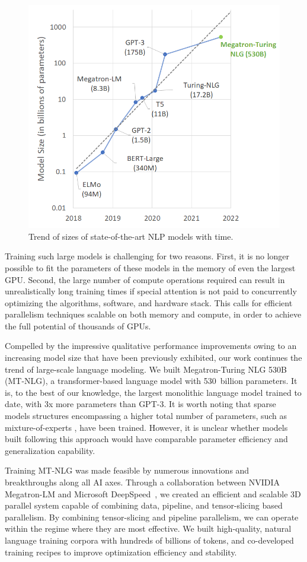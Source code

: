 \documentclass[11pt]{article}
\newcommand{\ours}{MT-NLG}
\begin{document}
\begin{figure}
    \centering
    \includegraphics[width=0.65\linewidth]{nlp-size-over-time.png}
    \caption{Trend of sizes of state-of-the-art NLP models with time.}
    \label{fig:nlp_trends}
\end{figure}

Training such large models is challenging for two reasons.  First, it is no longer possible to fit the parameters of these models in the memory of even the largest GPU.
Second, the large number of compute operations required can result in unrealistically long training times if special attention is not paid to concurrently optimizing the algorithms, software, and hardware stack. This calls for efficient parallelism techniques scalable on both memory and compute, in order to achieve the full potential of thousands of GPUs.


Compelled by the impressive qualitative performance improvements owing to an increasing model size that have been previously exhibited, our work continues the trend of large-scale language modeling. We built Megatron-Turing NLG 530B ({\ours}), a transformer-based language model with 530~billion  parameters. It is, to the best of our knowledge, the largest monolithic language model trained to date, with 3x more parameters than GPT-3. It is worth noting that sparse models structures encompassing a higher total number of parameters, such as mixture-of-experts \cite{Shazeer2017OutrageouslyLN}, have been trained. However, it is unclear whether models built following this approach would have comparable parameter efficiency and generalization capability.

Training {\ours} was made feasible by numerous innovations and breakthroughs along all AI axes. Through a collaboration between NVIDIA Megatron-LM \cite{megatron-DBLP:journals/corr/abs-1909-08053, Megatron_2021} and Microsoft DeepSpeed~\cite{rasley2020deepspeed,deepspeedgithub}, we created an efficient and scalable 3D parallel system capable of combining data, pipeline, and tensor-slicing based parallelism. By combining tensor-slicing and pipeline parallelism, we can operate within the regime where they are most effective. We built high-quality, natural language training corpora with hundreds of billions of tokens, and co-developed training recipes to improve optimization efficiency and stability.
\end{document}
